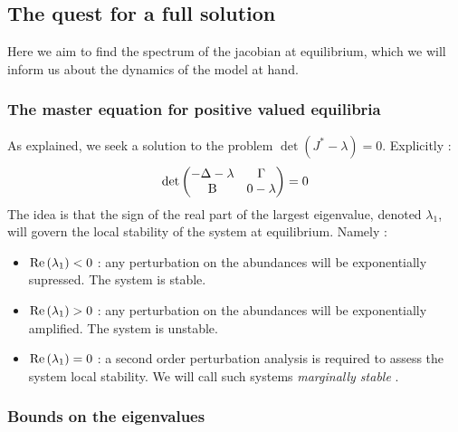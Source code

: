 \documentclass[12pt]{report}
\begin{document}
\subsection{The quest for a full solution}
Here we aim to find the spectrum of the jacobian at equilibrium, which we will inform us about the dynamics of the model at hand.
\subsubsection{The master equation for positive valued equilibria}
As explained, we seek a solution to the problem $\det\left(J^* - \lambda \right) = 0$. Explicitly :
\begin{equation}
\det
\begin{pmatrix}
  -\Delta - \lambda  & \Gamma \\
  \text{B} & 0-\lambda
\end{pmatrix} = 0 \label{eq : master equation eigenvalues jacobian}
\end{equation}
The idea is that the sign of the real part of the largest eigenvalue, denoted $\lambda_1$, will govern the local stability of the system at equilibrium. Namely :
\begin{itemize}
\item $\text{Re}\left(\lambda_1\right) < 0$ : any perturbation on the abundances will be exponentially supressed. The system is stable.
\item $\text{Re}\left(\lambda_1\right) > 0$ : any perturbation on the abundances will be exponentially amplified. The system is unstable.
\item $\text{Re}\left(\lambda_1\right)=0$ : a second order perturbation analysis is required to assess the system local stability. We will call such systems \textit{marginally stable} \cite{biroli_marginally_2018}.
\end{itemize}

\subsubsection{Bounds on the eigenvalues}
\end{document}
